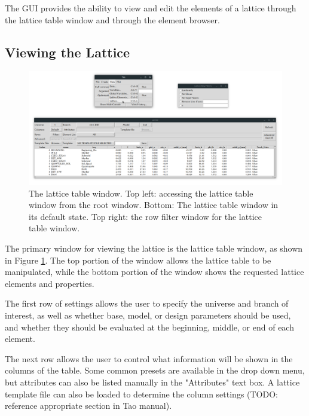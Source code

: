 The GUI provides the ability to view and edit the elements of a lattice through the lattice table window and through the element browser.

\subsection{Viewing the Lattice}
\label{s:gui.lat.table}

\begin{figure}
\centering
\includegraphics[width=12cm]{figures/lat_table.pdf}
\caption[The lattice table window.]{The lattice table window.
Top left: accessing the lattice table window from the root window.
Bottom: The lattice table window in its default state.
Top right: the row filter window for the lattice table window.}
\label{fig:gui.lat.table}
\end{figure}

The primary window for viewing the lattice is the lattice table window, as shown in Figure \ref{fig:gui.lat.table}.
The top portion of the window allows the lattice table to be manipulated, while the bottom portion of the window shows the requested lattice elements and properties.

The first row of settings allows the user to specify the universe and branch of interest, as well as whether base, model, or design parameters should be used, and whether they should be evaluated at the beginning, middle, or end of each element.

The next row allows the user to control what information will be shown in the columns of the table.
Some common presets are available in the drop down menu, but attributes can also be listed manually in the "Attributes" text box.
A lattice template file can also be loaded to determine the column settings (TODO: reference appropriate section in Tao manual).

